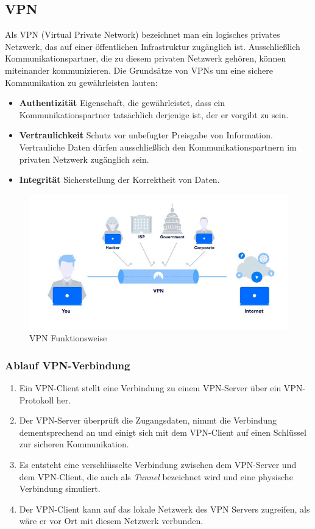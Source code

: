 \subsection{VPN}
Als VPN (Virtual Private Network) bezeichnet man ein logisches privates Netzwerk, das auf einer öffentlichen Infrastruktur zugänglich ist. Ausschließlich Kommunikationspartner, die zu diesem privaten Netzwerk gehören, können miteinander kommunizieren.\newline
Die Grundsätze von VPNs um eine sichere Kommunikation zu gewährleisten lauten:
\begin{itemize}
    \item \textbf{Authentizität} \newline
    Eigenschaft, die gewährleistet, dass ein Kommunikationspartner tatsächlich derjenige ist, der er vorgibt zu sein.
    \item \textbf{Vertraulichkeit} \newline
    Schutz vor unbefugter Preisgabe von Information. Vertrauliche Daten dürfen ausschließlich den Kommunikationspartnern im privaten Netzwerk zugänglich sein.
    \item \textbf{Integrität} \newline
    Sicherstellung der Korrektheit von Daten.
\end{itemize}
\begin{figure}[H]
  \centering
  \includegraphics[scale=0.85]{images/vpn.jpg}
  \caption{VPN Funktionsweise}
\end{figure}
\subsubsection{Ablauf VPN-Verbindung}
\begin{enumerate}
    \item Ein VPN-Client stellt eine Verbindung zu einem VPN-Server über ein VPN-Protokoll her.
    \item Der VPN-Server überprüft die Zugangsdaten, nimmt die Verbindung dementsprechend an und einigt sich mit dem VPN-Client auf einen Schlüssel zur sicheren Kommunikation.
    \item Es entsteht eine verschlüsselte Verbindung zwischen dem VPN-Server und dem VPN-Client, die auch als \textit{Tunnel} bezeichnet wird und eine physische Verbindung simuliert.
    \item Der VPN-Client kann auf das lokale Netzwerk des VPN Servers zugreifen, als wäre er vor Ort mit diesem Netzwerk verbunden.
\end{enumerate}
\newpage
\noindent
